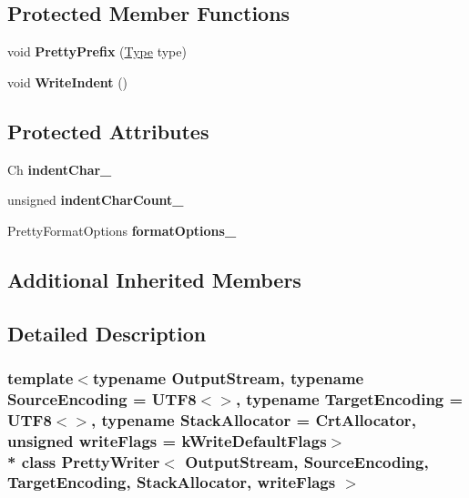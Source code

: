 \subsection*{Protected Member Functions}
\begin{DoxyCompactItemize}
\item 
void {\bfseries Pretty\+Prefix} (\hyperlink{rapidjson_8h_a1d1cfd8ffb84e947f82999c682b666a7}{Type} type)\hypertarget{classPrettyWriter_a09709ffa3b545e007631ecfd35029843}{}\label{classPrettyWriter_a09709ffa3b545e007631ecfd35029843}

\item 
void {\bfseries Write\+Indent} ()\hypertarget{classPrettyWriter_a6f244ecc94fd5b134d424033b1574b7e}{}\label{classPrettyWriter_a6f244ecc94fd5b134d424033b1574b7e}

\end{DoxyCompactItemize}
\subsection*{Protected Attributes}
\begin{DoxyCompactItemize}
\item 
Ch {\bfseries indent\+Char\+\_\+}\hypertarget{classPrettyWriter_aaa3f6380daa8466a5101ed18fc33bf04}{}\label{classPrettyWriter_aaa3f6380daa8466a5101ed18fc33bf04}

\item 
unsigned {\bfseries indent\+Char\+Count\+\_\+}\hypertarget{classPrettyWriter_a7d00b9716ef3cd7e34ae1b744c968f13}{}\label{classPrettyWriter_a7d00b9716ef3cd7e34ae1b744c968f13}

\item 
Pretty\+Format\+Options {\bfseries format\+Options\+\_\+}\hypertarget{classPrettyWriter_a15505ed4ea0fa85d339b3a987f1a3aaf}{}\label{classPrettyWriter_a15505ed4ea0fa85d339b3a987f1a3aaf}

\end{DoxyCompactItemize}
\subsection*{Additional Inherited Members}


\subsection{Detailed Description}
\subsubsection*{template$<$typename Output\+Stream, typename Source\+Encoding = U\+T\+F8$<$$>$, typename Target\+Encoding = U\+T\+F8$<$$>$, typename Stack\+Allocator = Crt\+Allocator, unsigned write\+Flags = k\+Write\+Default\+Flags$>$\\*
class Pretty\+Writer$<$ Output\+Stream, Source\+Encoding, Target\+Encoding, Stack\+Allocator, write\+Flags $>$}

